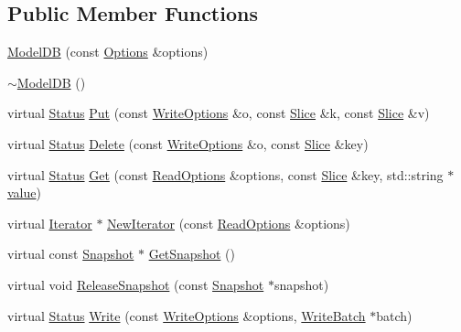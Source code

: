 \subsection*{Public Member Functions}
\begin{DoxyCompactItemize}
\item 
\hyperlink{classleveldb_1_1_model_d_b_ac0117ce964631ff7977b465de053a282}{Model\+D\+B} (const \hyperlink{structleveldb_1_1_options}{Options} \&options)
\item 
\hyperlink{classleveldb_1_1_model_d_b_a35e9042c7ed06e8324d5e40318771825}{$\sim$\+Model\+D\+B} ()
\item 
virtual \hyperlink{classleveldb_1_1_status}{Status} \hyperlink{classleveldb_1_1_model_d_b_a83d0ace11c8ff079f4e6eaa905744253}{Put} (const \hyperlink{structleveldb_1_1_write_options}{Write\+Options} \&o, const \hyperlink{classleveldb_1_1_slice}{Slice} \&k, const \hyperlink{classleveldb_1_1_slice}{Slice} \&v)
\item 
virtual \hyperlink{classleveldb_1_1_status}{Status} \hyperlink{classleveldb_1_1_model_d_b_a2c2690e07a206fd2197f592dd4478ff6}{Delete} (const \hyperlink{structleveldb_1_1_write_options}{Write\+Options} \&o, const \hyperlink{classleveldb_1_1_slice}{Slice} \&key)
\item 
virtual \hyperlink{classleveldb_1_1_status}{Status} \hyperlink{classleveldb_1_1_model_d_b_ab7744a74b5c0d2cd812dd87e83ca561b}{Get} (const \hyperlink{structleveldb_1_1_read_options}{Read\+Options} \&options, const \hyperlink{classleveldb_1_1_slice}{Slice} \&key, std\+::string $\ast$\hyperlink{cache_8cc_a0f61d63b009d0880a89c843bd50d8d76}{value})
\item 
virtual \hyperlink{classleveldb_1_1_iterator}{Iterator} $\ast$ \hyperlink{classleveldb_1_1_model_d_b_a5acf23bae313f2e2f3ea9f0ab95450cf}{New\+Iterator} (const \hyperlink{structleveldb_1_1_read_options}{Read\+Options} \&options)
\item 
virtual const \hyperlink{classleveldb_1_1_snapshot}{Snapshot} $\ast$ \hyperlink{classleveldb_1_1_model_d_b_aa82849af6a149d122e65a4aac412903f}{Get\+Snapshot} ()
\item 
virtual void \hyperlink{classleveldb_1_1_model_d_b_a3f5d86ce612baaa88c11601c9a59df12}{Release\+Snapshot} (const \hyperlink{classleveldb_1_1_snapshot}{Snapshot} $\ast$snapshot)
\item 
virtual \hyperlink{classleveldb_1_1_status}{Status} \hyperlink{classleveldb_1_1_model_d_b_ae3a20d2fc971376349b142b9c2d159be}{Write} (const \hyperlink{structleveldb_1_1_write_options}{Write\+Options} \&options, \hyperlink{classleveldb_1_1_write_batch}{Write\+Batch} $\ast$batch)

\end{DoxyCompactItemize}
